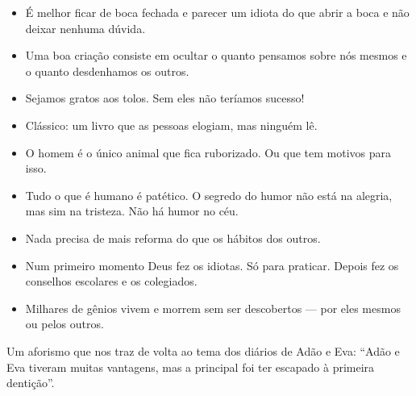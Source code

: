 \begin{itemize}
\item É melhor ficar de boca fechada e parecer um idiota do que abrir a
boca e não deixar nenhuma dúvida.

\item Uma boa criação consiste em ocultar o quanto pensamos sobre nós
mesmos e o quanto desdenhamos os outros.

\item Sejamos gratos aos tolos. Sem eles não teríamos sucesso!

\item Clássico: um livro que as pessoas elogiam, mas ninguém lê.

\item O homem é o único animal que fica ruborizado. Ou que tem motivos para
isso.

\item Tudo o que é humano é patético. O segredo do humor não está na
alegria, mas sim na tristeza. Não há humor no céu.

\item Nada precisa de mais reforma do que os hábitos dos outros.

\item Num primeiro momento Deus fez os idiotas. Só para praticar. Depois
fez os conselhos escolares e os colegiados.

\item Milhares de gênios vivem e morrem sem ser descobertos --- por eles
mesmos ou pelos outros.
\end{itemize}

Um aforismo que nos traz de volta ao tema dos diários de Adão e Eva:
``Adão e Eva tiveram muitas vantagens, mas a principal foi ter
escapado à primeira dentição''.


